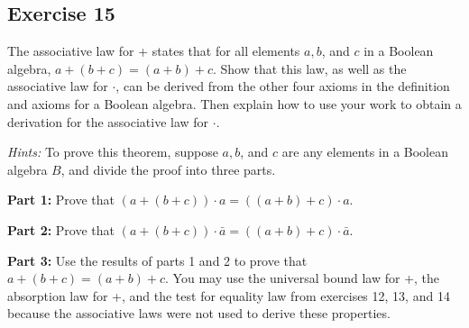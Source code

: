 \documentclass[14pt]{extarticle}
\begin{document}
\subsection{Exercise 15}
The associative law for + states that for all elements $a, b$, and $c$ in a Boolean algebra, \(a+(b+c) = (a+b)+c\).
Show that this law, as well as the associative law for $\cdot$, can be derived from the other four axioms in the
definition and axioms for a Boolean algebra. Then explain how to use your work to obtain a derivation for the
associative law for $\cdot$.

  {\it Hints:} To prove this theorem, suppose $a, b$, and $c$ are any elements in a Boolean algebra $B$, and divide the
proof into three parts.

  {\bf Part 1:} Prove that \((a + (b + c)) \cdot a = ((a + b) + c) \cdot a\).

  {\bf Part 2:} Prove that \((a + (b + c)) \cdot \bar{a} = ((a + b) + c) \cdot \bar{a}\).

  {\bf Part 3:} Use the results of parts 1 and 2 to prove that \(a + (b + c) = (a + b) + c\). You may use the
universal bound law for +, the absorption law for +, and the test for equality law from exercises 12, 13, and 14
because the associative laws were not used to derive these properties.
\end{document}
